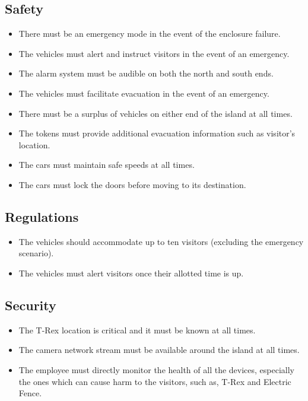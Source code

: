 \documentclass[12pt]{article}
\begin{document}
    \subsection{Safety}
    \begin{itemize}
        \item There must be an emergency mode in the event of the enclosure failure.
        \item The vehicles must alert and instruct visitors in the event of an emergency.
        \item The alarm system must be audible on both the north and south ends.
        \item The vehicles must facilitate evacuation in the event of an emergency.
        \item There must be a surplus of vehicles on either end of the island at all times.
        \item The tokens must provide additional evacuation information such as visitor's location.
        \item The cars must maintain safe speeds at all times.
        \item The cars must lock the doors before moving to its destination.
    \end{itemize}

    \subsection{Regulations}
    \begin{itemize}
        \item The vehicles should accommodate up to ten visitors (excluding the emergency scenario).
        \item The vehicles must alert visitors once their allotted time is up. 
    \end{itemize}

    \subsection{Security}
    \begin{itemize}
        \item The T-Rex location is critical and it must be known at all times.
        \item The camera network stream must be available around the island at all times.
        \item The employee must directly monitor the health of all the devices, especially the ones which can cause harm to the visitors, such as, T-Rex and Electric Fence. 
    \end{itemize}
\end{document}
